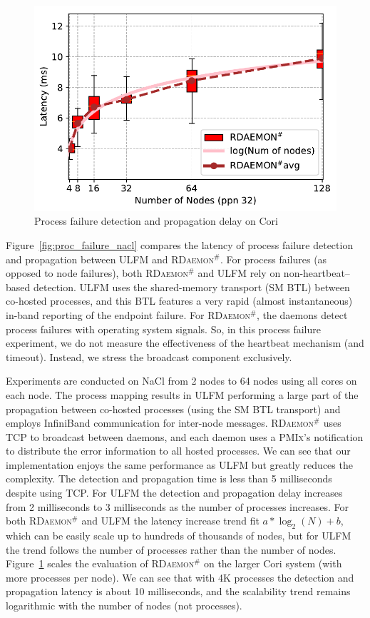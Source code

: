 \documentclass[sigconf]{acmart}
\newcommand{\pmix}[0]{\textsc{PMIx}\xspace}
\newcommand{\ulfm}[0]{\textsc{ULFM}\xspace}
\newcommand{\ourwork}[0]{\textsc{RDaemon}\ensuremath{^\#}\xspace}
\begin{document}
\begin{figure}[h]
  \centering
  \includegraphics[width=\linewidth]{Cori_Process_Failure_fit.pdf}
  \caption{Process failure detection and propagation delay on Cori}
  \label{fig:proc_failure_cori}
\end{figure}

Figure~\ref{fig:proc_failure_nacl} compares the latency of process failure detection and propagation between \ulfm and \ourwork. For process failures (as opposed to node failures), both 
\ourwork and \ulfm rely on non-heartbeat--based detection. 
%
\ulfm uses the 
shared-memory transport (SM BTL) between co-hosted processes, and this BTL 
features a very rapid (almost instantaneous) in-band reporting of the 
endpoint failure. For \ourwork, the daemons detect process failures
with operating system signals. 
%
So, in this process failure experiment, we do not measure 
the effectiveness of the heartbeat mechanism (and timeout). Instead, we  
stress the broadcast component exclusively.

Experiments are conducted on NaCl from 2 nodes to 64 nodes using all cores on each node.
The process mapping results in \ulfm performing a large part of the 
propagation between co-hosted processes (using the SM BTL transport) 
and employs InfiniBand communication for inter-node messages. 
\ourwork uses TCP to broadcast between daemons, and each daemon uses a
\pmix's notification to distribute the error information to all hosted processes.
%
 We can see that our implementation enjoys the same performance as \ulfm but greatly reduces the complexity. The detection and propagation time is less than 5 milliseconds despite using TCP. For \ulfm the detection and propagation delay increases from 2 milliseconds to 3 milliseconds as the  number of processes increases. For both \ourwork and \ulfm the latency increase trend fit $ a*\log_2(N) + b $, which can be easily scale up to hundreds of thousands of nodes, but for \ulfm
the trend follows the number of processes rather than the number of nodes. Figure~\ref{fig:proc_failure_cori} scales the evaluation of \ourwork on the larger Cori system (with more processes per node). We can see that with 4K processes the detection and propagation latency is about 10 milliseconds, and the scalability trend remains logarithmic with the number of nodes (not processes).
\end{document}
